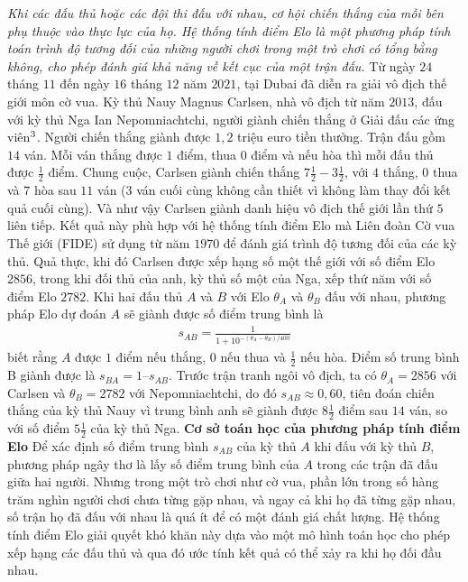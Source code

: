 \vspace*{200pt}

\begin{multicols}{2}
	\textit{Khi các đấu thủ hoặc các đội thi đấu với nhau, cơ hội chiến thắng của mỗi bên phụ thuộc vào thực lực của họ. Hệ thống tính điểm Elo là một phương pháp tính toán trình độ tương đối của những người chơi trong một trò chơi có tổng bằng không, cho phép đánh giá khả năng về kết cục của một trận đấu.}
	\vskip 0.05cm
	Từ ngày $24$ tháng $11$ đến ngày $16$ tháng $12$ năm $2021$, tại Dubai đã diễn ra giải vô địch thế giới môn cờ vua. Kỳ thủ Nauy Magnus Carlsen, nhà vô địch từ năm $2013$, đấu với kỳ thủ Nga Ian Nepomniachtchi, người giành chiến thắng ở Giải đấu các ứng viên$^{\small{3}}$. Người chiến thắng giành được $1{,}2$ triệu euro tiền thưởng.
	\vskip 0.05cm
	Trận đấu gồm $14$ ván. Mỗi ván thắng được $1$ điểm, thua $0$ điểm và nếu hòa thì mỗi đấu thủ được $\frac{1}{2}$ điểm. Chung cuộc, Carlsen giành chiến thắng $7\frac{1}{2} - 3\frac{1}{2}$, với $4$ thắng, $0$ thua và $7$ hòa sau $11$ ván ($3$ ván cuối cùng không cần thiết vì không làm thay đổi kết quả cuối cùng). Và như vậy Carlsen giành danh hiệu vô địch thế giới lần thứ $5$ liên tiếp.
	\vskip 0.05cm
	Kết quả này phù hợp với hệ thống tính điểm Elo mà Liên đoàn Cờ vua Thế giới (FIDE) sử dụng từ năm $1970$ để đánh giá trình độ tương đối của các kỳ thủ. Quả thực, khi đó Carlsen được xếp hạng số một thế giới với số điểm Elo $2856$, trong khi đối thủ của anh, kỳ thủ số một của Nga, xếp thứ năm với số điểm Elo $2782$.
	\vskip 0.05cm
	Khi hai đấu thủ $A$ và $B$ với Elo $\theta_A$ và $\theta_B$ đấu với nhau, phương pháp Elo dự đoán $A$ sẽ giành được số điểm trung bình là
	\setlength{\abovedisplayskip}{4pt}
	\setlength{\belowdisplayskip}{5pt}
	\begin{align*}
		s_{AB} = \frac{1}{1+ 10^{-(\theta_A - \theta_B) /400}} \tag{$1$}
	\end{align*}
	biết rằng $A$ được $1$ điểm nếu thắng, $0$ nếu thua và $\frac{1}{2}$ nếu hòa. Điểm số trung bình B giành được là $s_{BA} = 1 – s_{AB}$.
	\vskip 0.05cm
	Trước trận tranh ngôi vô địch, ta có $\theta_A = 2856$ với Carlsen và $\theta_B = 2782$ với Nepomniachtchi, do đó $s_{AB} \approx 0{,}60$, tiên đoán chiến thắng của kỳ thủ Nauy vì trung bình anh sẽ giành được $8\frac{1}{2}$ điểm sau $14$ ván, so với số điểm $5\frac{1}{2}$ của kỳ thủ Nga.
	\vskip 0.05cm
	\textbf{\color{toanhocdoisong}Cơ sở toán học của phương pháp tính điểm Elo}
	\vskip 0.05cm
	Để xác định số điểm trung bình $s_{AB}$ của kỳ thủ $A$ khi đấu với kỳ thủ $B$, phương pháp ngây thơ là lấy số điểm trung bình của $A$ trong các trận đã đấu giữa hai người. Nhưng trong một trò chơi như cờ vua, phần lớn trong số hàng trăm nghìn người chơi chưa từng gặp nhau, và ngay cả khi họ đã từng gặp nhau, số trận họ đã đấu với nhau là quá ít để có một đánh giá chất lượng. Hệ thống tính điểm Elo giải quyết khó khăn này dựa vào một mô hình toán học cho phép xếp hạng các đấu thủ và qua đó ước tính kết quả có thể xảy ra khi họ đối đầu nhau.

\end{multicols}
